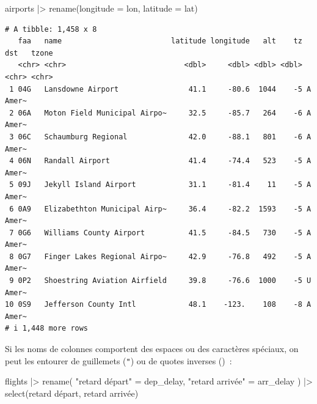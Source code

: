 \documentclass[
  letterpaper,
  DIV=11,
  numbers=noendperiod,
  oneside]{scrreprt}
\newenvironment{Shaded}{\begin{snugshade}}{\end{snugshade}}
\newcommand{\AttributeTok}[1]{\textcolor[rgb]{0.40,0.45,0.13}{#1}}
\newcommand{\FunctionTok}[1]{\textcolor[rgb]{0.28,0.35,0.67}{#1}}
\newcommand{\NormalTok}[1]{\textcolor[rgb]{0.00,0.23,0.31}{#1}}
\newcommand{\OtherTok}[1]{\textcolor[rgb]{0.00,0.23,0.31}{#1}}
\newcommand{\SpecialCharTok}[1]{\textcolor[rgb]{0.37,0.37,0.37}{#1}}
\newcommand{\StringTok}[1]{\textcolor[rgb]{0.13,0.47,0.30}{#1}}
\begin{document}
\begin{Shaded}
\begin{Highlighting}[]
\NormalTok{airports }\SpecialCharTok{|\textgreater{}} 
  \FunctionTok{rename}\NormalTok{(}\AttributeTok{longitude =}\NormalTok{ lon, }\AttributeTok{latitude =}\NormalTok{ lat)}
\end{Highlighting}
\end{Shaded}

\begin{verbatim}
# A tibble: 1,458 x 8
   faa   name                         latitude longitude   alt    tz dst   tzone
   <chr> <chr>                           <dbl>     <dbl> <dbl> <dbl> <chr> <chr>
 1 04G   Lansdowne Airport                41.1     -80.6  1044    -5 A     Amer~
 2 06A   Moton Field Municipal Airpo~     32.5     -85.7   264    -6 A     Amer~
 3 06C   Schaumburg Regional              42.0     -88.1   801    -6 A     Amer~
 4 06N   Randall Airport                  41.4     -74.4   523    -5 A     Amer~
 5 09J   Jekyll Island Airport            31.1     -81.4    11    -5 A     Amer~
 6 0A9   Elizabethton Municipal Airp~     36.4     -82.2  1593    -5 A     Amer~
 7 0G6   Williams County Airport          41.5     -84.5   730    -5 A     Amer~
 8 0G7   Finger Lakes Regional Airpo~     42.9     -76.8   492    -5 A     Amer~
 9 0P2   Shoestring Aviation Airfield     39.8     -76.6  1000    -5 U     Amer~
10 0S9   Jefferson County Intl            48.1    -123.    108    -8 A     Amer~
# i 1,448 more rows
\end{verbatim}

Si les noms de colonnes comportent des espaces ou des caractères
spéciaux, on peut les entourer de guillemets (\texttt{"}) ou de quotes
inverses (\texttt{\textasciigrave{}})~:

\begin{Shaded}
\begin{Highlighting}[]
\NormalTok{flights }\SpecialCharTok{|\textgreater{}} 
  \FunctionTok{rename}\NormalTok{(}
    \StringTok{"retard départ"} \OtherTok{=}\NormalTok{ dep\_delay,}
    \StringTok{"retard arrivée"} \OtherTok{=}\NormalTok{ arr\_delay}
\NormalTok{  ) }\SpecialCharTok{|\textgreater{}} 
  \FunctionTok{select}\NormalTok{(}\StringTok{\textasciigrave{}}\AttributeTok{retard départ}\StringTok{\textasciigrave{}}\NormalTok{, }\StringTok{\textasciigrave{}}\AttributeTok{retard arrivée}\StringTok{\textasciigrave{}}\NormalTok{)}
\end{Highlighting}
\end{Shaded}
\end{document}
